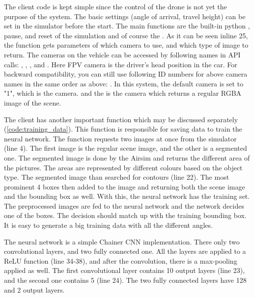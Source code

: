 The client code is kept simple since the control of the drone is not yet the purpose of the system.
The basic settings (angle of arrival, travel height) can be set in the simulator before the start.
The main functions are the built-in python , pause, and reset of the simulation and of course the .
As it can be seen inline 25, the function gets parameters of which camera to use, and which type of image to return.
The cameras on the vehicle can be accessed by following names in API calls: , , ,  and . Here FPV camera is the driver's head position in the car.
For backward compatibility, you can still use following ID numbers for above camera names in the same order as above: .
In this system, the default camera is set to "1", which is the  camera.
and the  is the  camera which returns a regular RGBA image of the scene.

The client has another important function which may be discussed separately (\cref{code:training_data}).
This function is responsible for saving data to train the neural network.
The function requests two images at once from the simulator (line 4).
The first image is the regular scene image, and the other is a segmented one.
The segmented image is done by the Airsim and returns the different area of the pictures.
The areas are represented by different colours based on the object type.
The segmented image than searched for contours (line 22).
The most prominent 4 boxes then added to the image and returning both the scene image and the bounding box as well.
With this, the neural network has the training set.
The preprocessed images are fed to the neural network and the network decides one of the boxes.
The decision should match up with the training bounding box.
It is easy to generate a big training data with all the different angles.

The neural network is a simple Chainer CNN implementation.
There only two convolutional layers, and two fully connected one.
All the layers are applied to a ReLU function (line 34-38), and after the convolution, there is a max-pooling applied as well.
The first convolutional layer contains 10 output layers (line 23), and the second one contains 5 (line 24).
The two fully connected layers have 128 and 2 output layers. 

